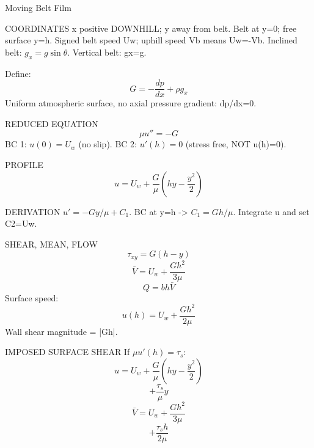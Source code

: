 Moving Belt Film

COORDINATES
x positive DOWNHILL; y away from belt.
Belt at y=0; free surface y=h.
Signed belt speed Uw; uphill speed Vb means Uw=-Vb.
Inclined belt: $g_x=g\sin\theta$.
Vertical belt: gx=g.

Define:
$$G=-\frac{dp}{dx}+\rho g_x$$
Uniform atmospheric surface, no axial pressure gradient: dp/dx=0.

REDUCED EQUATION
$$\mu u''=-G$$
BC 1: $u(0)=U_w$ (no slip).
BC 2: $u'(h)=0$ (stress free, NOT u(h)=0).

PROFILE
$$u=U_w+\frac{G}{\mu}(hy-\frac{y^2}{2})$$

DERIVATION
$u'=-Gy/\mu+C_1$.
BC at y=h -> $C_1=Gh/\mu$.
Integrate u and set C2=Uw.

SHEAR, MEAN, FLOW
$$\tau_{xy}=G(h-y)$$
$$\bar V=U_w+\frac{Gh^2}{3\mu}$$
$$Q=bh\bar V$$
Surface speed:
$$u(h)=U_w+\frac{Gh^2}{2\mu}$$
Wall shear magnitude = |Gh|.

IMPOSED SURFACE SHEAR
If $\mu u'(h)=\tau_s$:
$$u=U_w+\frac{G}{\mu}(hy-\frac{y^2}{2})$$
$$+\frac{\tau_s}{\mu}y$$
$$\bar V=U_w+\frac{Gh^2}{3\mu}$$
$$+\frac{\tau_sh}{2\mu}$$
